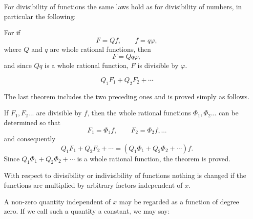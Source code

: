 
For divisibility of functions the same laws hold as for divisibility of numbers, in particular the following:


For if
\[
 F=Qf,
 \qquad
 f=q\varphi,
\]
where $Q$ and $q$ are whole rational functions, then
\[
 F=Qq\varphi,
\]
and since $Qq$ is a whole rational function, $F$ is divisible by $\varphi$.



\[
 Q_1F_1+Q_2F_2+\cdots
\]

The last theorem includes the two preceding ones and is proved simply as follows.

If $F_1,F_2\ldots$ are divisible by $f$, then the whole rational functions $\Phi_1,\Phi_2\ldots$ can be determined so that
\[
 F_1=\Phi_1f,
 \qquad
 F_2=\Phi_2f,\ldots
\]
and consequently
\[
 Q_1F_1+Q_2F_2+\cdots=(Q_1\Phi_1+Q_2\Phi_2+\cdots)f.
\]
Since $Q_1\Phi_1+Q_2\Phi_2+\cdots$ is a whole rational function, the theorem is proved.


With respect to divisibility or indivisibility of functions nothing is changed if the functions are multiplied by arbitrary factors independent of $x$.

A non-zero quantity independent of $x$ may be regarded as a function of degree zero. If we call such a quantity a constant, we may say:


